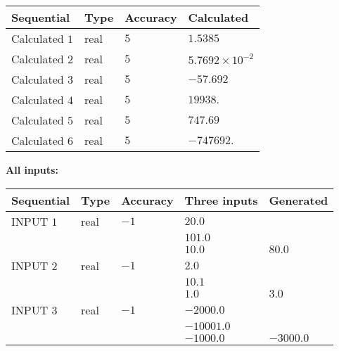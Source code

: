 \documentclass[12pt]{article}
\begin{document}
  
\noindent\begin{tabular}{|l|l|l|l|}
\hline
 Sequential & Type & Accuracy & Calculated \\ 
\hline
 
 
  Calculated $            1 $ & real & $            5  $ & 
 $ 1.5385 $ 
 \\  \hline  
 
 
  Calculated $            2 $ & real & $            5  $ & 
 $ 5.7692 \times 10^{-2} $ 
 \\  \hline  
 
 
  Calculated $            3 $ & real & $            5  $ & 
 $ -57.692 $ 
 \\  \hline  
 
 
  Calculated $            4 $ & real & $            5  $ & 
 $ 19938. $ 
 \\  \hline  
 
 
  Calculated $            5 $ & real & $            5  $ & 
 $ 747.69 $ 
 \\  \hline  
 
 
  Calculated $            6 $ & real & $            5  $ & 
 $ -747692. $ 
 \\  \hline  
 \end{tabular}
   
   
   
   
\noindent\vspace{0.1in}\hspace{-0.08in} {\textbf{\Large{All inputs: }}}
   
   
  
  
\noindent\begin{tabular}{|l|l|l|l|l|}
\hline
 Sequential & Type & Accuracy & Three inputs & Generated \\ 
\hline
 
 
  INPUT $            1 $ & real & $           -1  $ & $
 20.0
  $ & \\
  & & &  $
 101.0
  $ & \\
  & & &  $
 10.0
 $ & $ 80.0 $ 
 \\  \hline  
 
 
  INPUT $            2 $ & real & $           -1  $ & $
 2.0
  $ & \\
  & & &  $
 10.1
  $ & \\
  & & &  $
 1.0
 $ & $ 3.0 $ 
 \\  \hline  
 
 
  INPUT $            3 $ & real & $           -1  $ & $
 -2000.0
  $ & \\
  & & &  $
 -10001.0
  $ & \\
  & & &  $
 -1000.0
 $ & $ -3000.0 $ 
 \\  \hline  
 \end{tabular}
   
\end{document}
